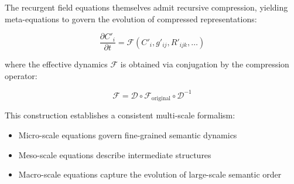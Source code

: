 The recurgent field equations themselves admit recursive compression, yielding meta-equations to govern the evolution of compressed representations:

\begin{equation}
\frac{\partial C'_i}{\partial t} = \mathcal{F}(C'_i, g'_{ij}, R'_{ijk}, \ldots)
\end{equation}

where the effective dynamics \(\mathcal{F}\) is obtained via conjugation by the compression operator:

\begin{equation}
\mathcal{F} = \mathcal{D} \circ \mathcal{F}_{\mathrm{original}} \circ \mathcal{D}^{-1}
\end{equation}

This construction establishes a consistent multi-scale formalism:
\begin{itemize}
    \item Micro-scale equations govern fine-grained semantic dynamics
    \item Meso-scale equations describe intermediate structures
    \item Macro-scale equations capture the evolution of large-scale semantic order
\end{itemize}
